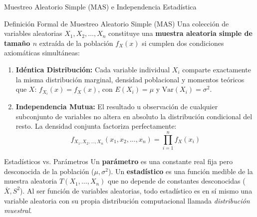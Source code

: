 \documentclass[10pt, aspectratio=169]{beamer}
\begin{document}
\begin{frame}{Muestreo Aleatorio Simple (MAS) e Independencia Estadística}
  \fontsize{7.5pt}{9pt}\selectfont
  \begin{block}{Definición Formal de Muestreo Aleatorio Simple (MAS)}
    \fontsize{7.5pt}{9pt}\selectfont
    Una colección de variables aleatorias $X_1, X_2, \ldots, X_n$ constituye una \textbf{muestra aleatoria simple de tamaño $n$} extraída de la población $f_X(x)$ si cumplen dos condiciones axiomáticas simultáneas:
    \begin{enumerate}\itemsep=0.1cm
      \item \textbf{Idéntica Distribución:} Cada variable individual $X_i$ comparte exactamente la misma distribución marginal, densidad poblacional y momentos teóricos que $X$: $f_{X_i}(x) = f_X(x)$, con $E(X_i) = \mu$ y $\text{Var}(X_i) = \sigma^2$.
      \item \textbf{Independencia Mutua:} El resultado u observación de cualquier subconjunto de variables no altera en absoluto la distribución condicional del resto. La densidad conjunta factoriza perfectamente:
      $$f_{X_1, X_2, \ldots, X_n}(x_1, x_2, \ldots, x_n) = \prod_{i=1}^n f_X(x_i)$$
    \end{enumerate}
  \end{block}
  \vspace{-0.15cm}
  \pause
  \begin{alertblock}{Estadísticos vs. Parámetros}
    \fontsize{7.5pt}{9pt}\selectfont
    Un \textbf{parámetro} es una constante real fija pero desconocida de la población ($\mu, \sigma^2$). Un \textbf{estadístico} es una función medible de la muestra aleatoria $T(X_1, \ldots, X_n)$ que no depende de constantes desconocidas ($\bar{X}, S^2$). Al ser función de variables aleatorias, todo estadístico es en sí mismo una variable aleatoria con su propia distribución computacional llamada \emph{distribución muestral}.
  \end{alertblock}
\end{frame}
\end{document}
